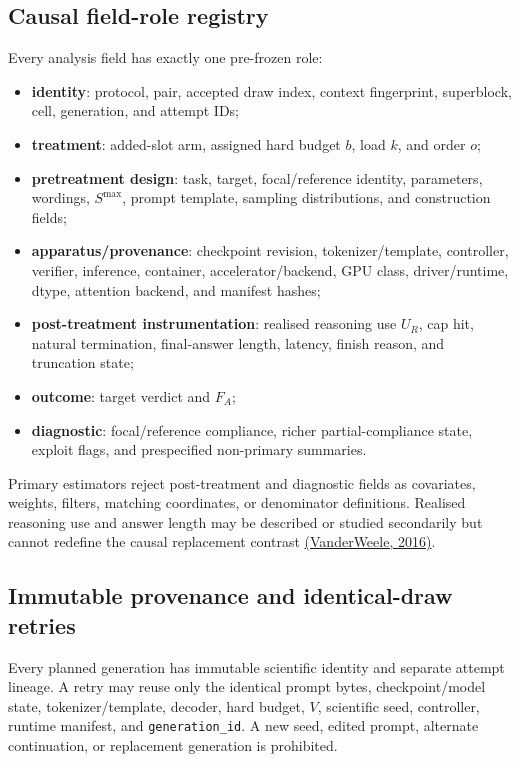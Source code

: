 \documentclass[11pt,a4paper]{article}
\begin{document}
\subsection{Causal field-role registry}
Every analysis field has exactly one pre-frozen role:
\begin{itemize}
\item \textbf{identity}: protocol, pair, accepted draw index, context fingerprint, superblock, cell, generation, and attempt IDs;
\item \textbf{treatment}: added-slot arm, assigned hard budget $b$, load $k$, and order $o$;
\item \textbf{pretreatment design}: task, target, focal/reference identity, parameters, wordings, $S^{\max}$, prompt template, sampling distributions, and construction fields;
\item \textbf{apparatus/provenance}: checkpoint revision, tokenizer/template, controller, verifier, inference, container, accelerator/backend, GPU class, driver/runtime, dtype, attention backend, and manifest hashes;
\item \textbf{post-treatment instrumentation}: realised reasoning use $U_R$, cap hit, natural termination, final-answer length, latency, finish reason, and truncation state;
\item \textbf{outcome}: target verdict and $F_A$;
\item \textbf{diagnostic}: focal/reference compliance, richer partial-compliance state, exploit flags, and prespecified non-primary summaries.
\end{itemize}
Primary estimators reject post-treatment and diagnostic fields as covariates, weights, filters, matching coordinates, or denominator definitions. Realised reasoning use and answer length may be described or studied secondarily but cannot redefine the causal replacement contrast \href{https://doi.org/10.1146/annurev-publhealth-032315-021402}{(VanderWeele, 2016)}.

\subsection{Immutable provenance and identical-draw retries}
Every planned generation has immutable scientific identity and separate attempt lineage. A retry may reuse only the identical prompt bytes, checkpoint/model state, tokenizer/template, decoder, hard budget, $V$, scientific seed, controller, runtime manifest, and \texttt{generation\_id}. A new seed, edited prompt, alternate continuation, or replacement generation is prohibited.
\end{document}
